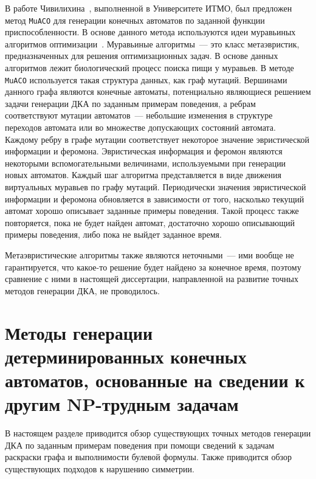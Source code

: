В работе Чивилихина~\cite{chivilikhin-phd-15}, выполненной в Университете ИТМО, был предложен метод \texttt{MuACO} для генерации конечных автоматов по заданной функции приспособленности.
В основе данного метода используются идеи муравьиных алгоритмов оптимизации~\cite{DBLP:reference/ml/DorigoB17}.
Муравьиные алгоритмы~--- это класс метаэвристик, предназначенных для решения оптимизационных задач.
В основе данных алгоритмов лежит биологический процесс поиска пищи у муравьев.
В методе \texttt{MuACO} используется такая структура данных, как граф мутаций.
Вершинами данного графа являются конечные автоматы, потенциально являющиеся решением задачи генерации ДКА по заданным примерам поведения, а ребрам соответствуют мутации автоматов~--- небольшие изменения в структуре переходов автомата или во множестве допускающих состояний автомата.
Каждому ребру в графе мутации соответствует некоторое значение эвристической информации и феромона.
Эвристическая информация и феромон являются некоторыми вспомогательными величинами, используемыми при генерации новых автоматов.
Каждый шаг алгоритма представляется в виде движения виртуальных муравьев по графу мутаций.
Периодически значения эвристической информации и феромона обновляется в зависимости от того, насколько текущий автомат хорошо описывает заданные примеры поведения.
Такой процесс также повторяется, пока не будет найден автомат, достаточно хорошо описывающий примеры поведения, либо пока не выйдет заданное время.

Метаэвристические алгоритмы также являются неточными~--- ими вообще не гарантируется, что какое-то решение будет найдено за конечное время, поэтому сравнение с ними в настоящей диссертации, направленной на развитие точных методов генерации ДКА, не проводилось.


\section{Методы генерации детерминированных конечных автоматов, основанные на сведении к другим NP-трудным задачам} 
\label{sec:review:sat-dfa-inf} 

В настоящем разделе приводится обзор существующих точных методов генерации ДКА по заданным примерам поведения при помощи сведений к задачам раскраски графа и выполнимости булевой формулы.
Также приводится обзор существующих подходов к нарушению симметрии.

